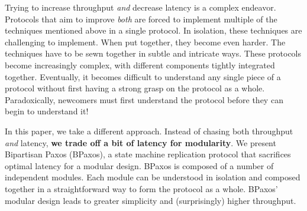 Trying to increase throughput \emph{and} decrease latency is a complex
endeavor. Protocols that aim to improve \emph{both} are forced to implement
multiple of the techniques mentioned above in a single protocol. In isolation,
these techniques are challenging to implement. When put together, they become
even harder. The techniques have to be sewn together in subtle and intricate
ways. These protocols become increasingly complex, with different components
tightly integrated together. Eventually, it becomes difficult to understand any
single piece of a protocol without first having a strong grasp on
the protocol as a whole. Paradoxically, newcomers must first understand the
protocol before they can begin to understand it!

In this paper, we take a different approach. Instead of chasing both throughput
\emph{and} latency, \textbf{we trade off a bit of latency for modularity}. We
present Bipartisan Paxos (BPaxos), a state machine replication protocol that
sacrifices optimal latency for a modular design. BPaxos is composed of a number
of independent modules. Each module can be understood in isolation and composed
together in a straightforward way to form the protocol as a whole. BPaxos'
modular design leads to greater simplicity and (surprisingly) higher
throughput.

%
%

